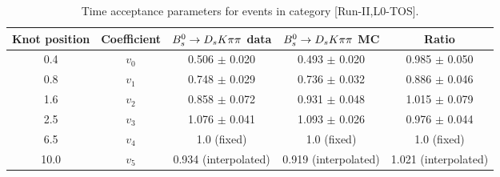 \begin{table}[hp!]
\centering
\small
\caption{Time acceptance parameters for events in category [\textsf{Run-II},\textsf{L0-TOS}].}
\begin{tabular}{c c c c c}
\hline
\hline
Knot position & Coefficient & ${{B}^0_{s}}\rightarrow{\ensuremath{{D}_{s}}}{\ensuremath{K}}{\ensuremath{\pi}}{\ensuremath{\pi}}$ data & ${{B}^0_{s}}\rightarrow{\ensuremath{{D}_{s}}}{\ensuremath{K}}{\ensuremath{\pi}}{\ensuremath{\pi}}$ MC & Ratio \\
\hline
0.4 & $v_{0}$ & 0.506 $\pm$ 0.020 & 0.493 $\pm$ 0.020 & 0.985 $\pm$ 0.050\\
0.8 & $v_{1}$ & 0.748 $\pm$ 0.029 & 0.736 $\pm$ 0.032 & 0.886 $\pm$ 0.046\\
1.6 & $v_{2}$ & 0.858 $\pm$ 0.072 & 0.931 $\pm$ 0.048 & 1.015 $\pm$ 0.079\\
2.5 & $v_{3}$ & 1.076 $\pm$ 0.041 & 1.093 $\pm$ 0.026 & 0.976 $\pm$ 0.044\\
6.5 & $v_{4}$ &  1.0 (fixed) & 1.0 (fixed) & 1.0 (fixed)\\
10.0 & $v_{5}$ & 0.934 (interpolated) & 0.919 (interpolated) & 1.021 (interpolated) \\
\hline
\hline
\end{tabular}
\label{table:splines}
\end{table}